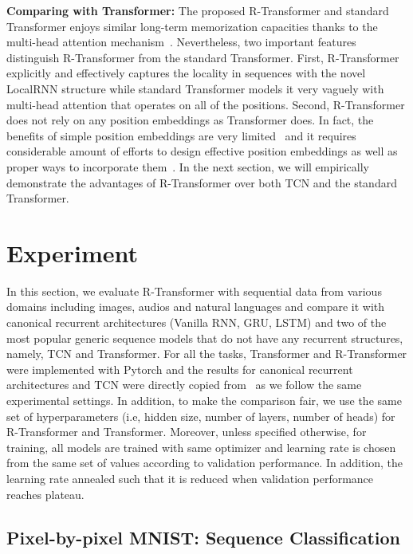 \documentclass{article} \usepackage{iclr2019_conference,times}
\begin{document}
{\bf Comparing with Transformer:} The proposed R-Transformer and standard Transformer enjoys similar long-term memorization capacities thanks to the multi-head attention mechanism~\citep{vaswani2017attention}. Nevertheless, two important features distinguish R-Transformer from the standard Transformer. First, R-Transformer explicitly and effectively captures the locality in sequences with the novel LocalRNN structure while standard Transformer models it very vaguely with multi-head attention that operates on all of the positions. Second, R-Transformer does not rely on any position embeddings as Transformer does. In fact, the benefits of simple position embeddings are very limited~\citep{al2018character} and it requires considerable amount of efforts to design effective position embeddings as well as proper ways to incorporate them~\citep{dai2019transformer}. In the next section, we will empirically demonstrate the advantages of R-Transformer over both TCN and the standard Transformer. 
 \section{Experiment}
In this section, we evaluate R-Transformer with sequential data from various domains including images, audios and natural languages and compare it with canonical recurrent architectures (Vanilla RNN, GRU, LSTM) and two of the most popular generic sequence models that do not have any recurrent structures, namely, TCN and Transformer. For all the tasks, Transformer and R-Transformer were implemented with Pytorch and the results for canonical recurrent architectures and TCN were directly copied from~\citet{bai2018empirical} as we follow the same experimental settings. In addition, to make the comparison fair, we use the same set of hyperparameters (i.e, hidden size, number of layers, number of heads) for R-Transformer and Transformer. Moreover, unless specified otherwise, for training, all models are trained with same optimizer and learning rate is chosen from the same set of values according to validation performance. In addition, the learning rate annealed such that it is reduced when validation performance reaches plateau.

\subsection{Pixel-by-pixel MNIST: Sequence Classification}
\end{document}
